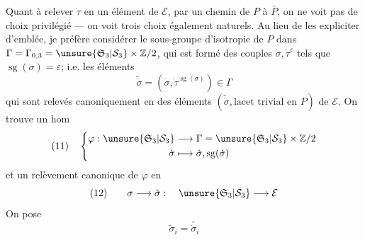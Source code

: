 Quant à relever $\dot\tau$ en un élément de $\mathcal E$, par un chemin de $P$ à $\bar P$, on ne voit pas de choix privilégié --- on voit trois choix également naturels. Au lieu de les expliciter d'emblée, je préfère considérer le sous-groupe d'isotropie de $P$ dans $\Gamma=\Gamma_{0,3}=\unsure{\mathfrak S_3|\mathcal S_3}\times\mathbb Z/2$, qui est formé des couples $\dot\sigma,\dot\tau^\varepsilon$ tels que $\operatorname{sg}(\dot\sigma)=\varepsilon$;  i.e. les éléments
\[
\widetilde{\dot\sigma}=(\dot\sigma,\dot\tau^{\operatorname{sg}(\dot\sigma)})\in\Gamma
\]
qui sont relevés canoniquement en des éléments $(\widetilde{\dot\sigma},\text{lacet trivial en }P)$ de $\mathcal E$. On trouve un hom
\[
(11)\quad\left\{\begin{aligned}
\varphi:\unsure{\mathfrak S_3|\mathcal S_3}&\longrightarrow\Gamma=\unsure{\mathfrak S_3|\mathcal S_3}\times\mathbb Z/2\\
\dot\sigma&\longmapsto\dot\sigma,\operatorname{sg}(\dot\sigma)
\end{aligned}\right.
\]
et un relèvement canonique de $\varphi$ en
\[
(12)\qquad\sigma\longrightarrow\tilde\sigma:\quad\unsure{\mathfrak S_3|\mathcal S_3}\longrightarrow\mathcal E
\]
On pose
\[
\tilde\sigma_i=\widetilde{\dot\sigma_i}
\]

